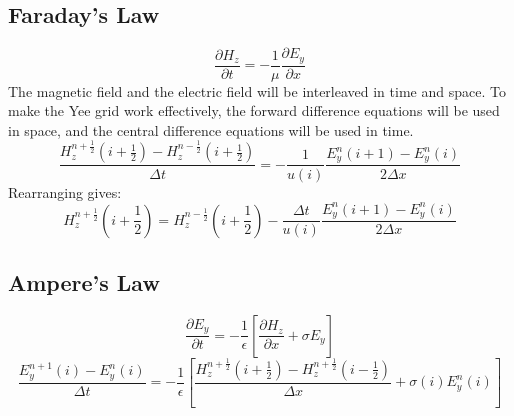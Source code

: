 \documentclass{article}
\begin{document}
        \subsection{Faraday's Law}
            \[
                \frac{\partial H_z}{\partial t}
                =
                -\frac{1}{\mu}\frac{\partial E_y}{\partial x}
            \]
            The magnetic field and the electric field will be interleaved in time and space. 
            To make the Yee grid work effectively, the forward difference equations will be used in space, and the central difference equations will be used in time.
            \[
                \frac{H_z^{n+\frac{1}{2}}\left(i+ \frac{1}{2} \right) - H_z^{n-\frac{1}{2}}\left(i+ \frac{1}{2} \right)  }{\Delta t}
                =
                -\frac{1}{u(i)}
                \frac{E_y^n(i+1)-E_y^n(i)}{2\Delta x}
            \]
            Rearranging gives:
            \[
                H_z^{n+\frac{1}{2}}\left(i+ \frac{1}{2} \right)
                =
                H_z^{n-\frac{1}{2}}\left(i+ \frac{1}{2} \right)
                -\frac{\Delta t}{u(i)}
                \frac{E_y^n(i+1)-E_y^n(i)}{2\Delta x}
            \]

        \subsection{Ampere's Law}
            \[
                \frac{\partial E_y}{\partial t}
                =
                -\frac{1}{\epsilon}
                \left[
                    \frac{\partial H_z}{\partial x}
                    +
                    \sigma E_y
                \right]
            \]
            \[
                \frac{E_y^{n+1}(i) - E_y^{n}(i)}{\Delta t}
                =
                -\frac{1}{\epsilon}
                \left[
                    \frac{H_z^{n+\frac{1}{2}}\left( i+\frac{1}{2} \right) -H_z^{n+\frac{1}{2}}\left( i-\frac{1}{2} \right) }{\Delta x}
                    +
                    \sigma(i) E_y^{n}(i)
                \right]
            \]
\end{document}
